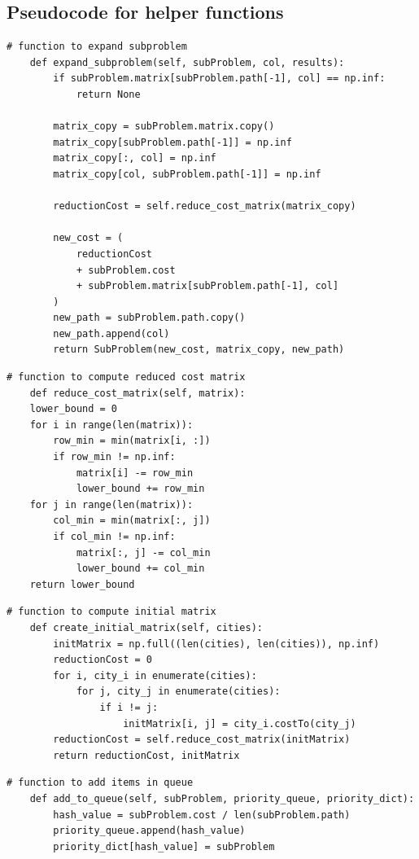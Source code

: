 \documentclass[12pt]{article}
\begin{document}
\newpage

\subsection{Pseudocode for helper functions}
\begin{lstlisting}[style=mystyle]
    # function to expand subproblem
    def expand_subproblem(self, subProblem, col, results):
        if subProblem.matrix[subProblem.path[-1], col] == np.inf:
            return None

        matrix_copy = subProblem.matrix.copy()
        matrix_copy[subProblem.path[-1]] = np.inf
        matrix_copy[:, col] = np.inf
        matrix_copy[col, subProblem.path[-1]] = np.inf

        reductionCost = self.reduce_cost_matrix(matrix_copy)

        new_cost = (
            reductionCost
            + subProblem.cost
            + subProblem.matrix[subProblem.path[-1], col]
        )
        new_path = subProblem.path.copy()
        new_path.append(col)
        return SubProblem(new_cost, matrix_copy, new_path)
    \end{lstlisting}
\newpage
\begin{lstlisting}[style=mystyle]
    # function to compute reduced cost matrix
    def reduce_cost_matrix(self, matrix):
    lower_bound = 0
    for i in range(len(matrix)):
        row_min = min(matrix[i, :])
        if row_min != np.inf:
            matrix[i] -= row_min
            lower_bound += row_min
    for j in range(len(matrix)):
        col_min = min(matrix[:, j])
        if col_min != np.inf:
            matrix[:, j] -= col_min
            lower_bound += col_min
    return lower_bound
\end{lstlisting}

\begin{lstlisting}[style=mystyle]
    # function to compute initial matrix
    def create_initial_matrix(self, cities):
        initMatrix = np.full((len(cities), len(cities)), np.inf)
        reductionCost = 0
        for i, city_i in enumerate(cities):
            for j, city_j in enumerate(cities):
                if i != j:
                    initMatrix[i, j] = city_i.costTo(city_j)
        reductionCost = self.reduce_cost_matrix(initMatrix)
        return reductionCost, initMatrix
\end{lstlisting}

\begin{lstlisting}[style=mystyle]
    # function to add items in queue
    def add_to_queue(self, subProblem, priority_queue, priority_dict):
        hash_value = subProblem.cost / len(subProblem.path)
        priority_queue.append(hash_value)
        priority_dict[hash_value] = subProblem
    \end{lstlisting}
\end{document}
